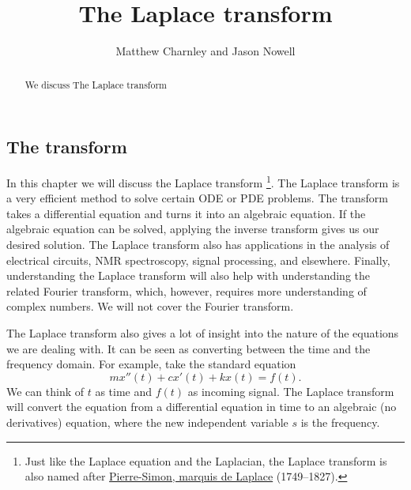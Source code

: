 \documentclass{ximera}
\title{The Laplace transform}
\author{Matthew Charnley and Jason Nowell}
\begin{document}
\begin{abstract}
    We discuss The Laplace transform
\end{abstract}
\maketitle

\label{laplace:section}




\subsection{The transform}

In this chapter we will discuss the Laplace transform%
\footnote{
    Just like the Laplace equation and the Laplacian, the Laplace transform is also named after  \href{https://en.wikipedia.org/wiki/Laplace}{Pierre-Simon, marquis de Laplace} (1749--1827).
    }.
The Laplace transform is a very efficient method to solve certain ODE or PDE problems. The transform takes a differential equation and turns it into an algebraic equation.  If the algebraic equation can be solved, applying the inverse transform gives us our desired solution. The Laplace transform also has applications in the analysis of  electrical circuits, NMR spectroscopy, signal processing, and elsewhere. Finally, understanding the Laplace transform will also help with understanding the related Fourier transform, which, however, requires more understanding of complex numbers.  We will not cover the Fourier transform.

The Laplace transform also gives a lot of insight into the nature of the equations we are dealing with.  It can be seen as converting between the time and the frequency domain.  For example, take the standard equation 
\begin{equation*}
    m x''(t) + c x'(t) + k x(t) = f(t) .
\end{equation*}
We can think of $t$ as time and $f(t)$ as incoming signal.  The Laplace transform will convert the equation from a differential equation in time to an algebraic (no derivatives) equation, where the new independent variable $s$ is the frequency.
\end{document}
